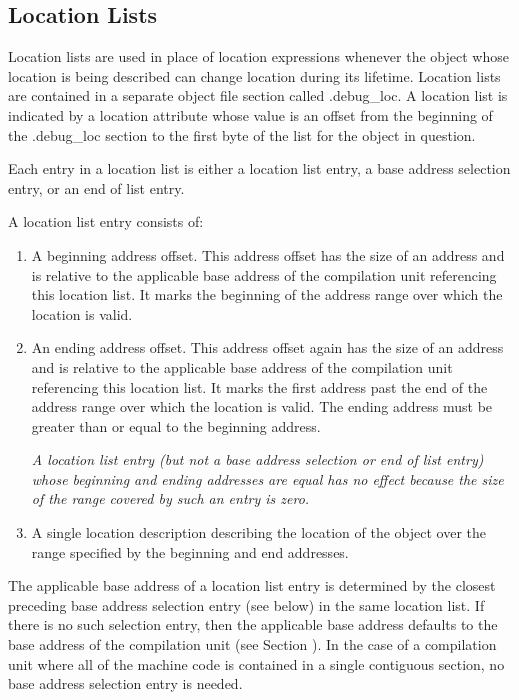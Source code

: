 \subsection{Location Lists}
\label{chap:locationlists}
Location lists are used in place of location expressions
whenever the object whose location is being described
can change location during its lifetime. Location lists
are contained in a separate object file section called
.debug\_loc. A location list is indicated by a location
attribute whose value is an offset from the beginning of
the .debug\_loc section to the first byte of the list for the
object in question.

Each entry in a location list is either a location list entry,
a base address selection entry, or an end of list entry.

A location list entry consists of:

\begin{enumerate}[1]
\item A beginning address offset. 
This address offset has the size of an address and is
relative to the applicable base address of the compilation
unit referencing this location list. It marks the beginning
of the address range over which the location is valid.

\item An ending address offset.  This address offset again
has the size of an address and is relative to the applicable
base address of the compilation unit referencing this location
list. It marks the first address past the end of the address
range over which the location is valid. The ending address
must be greater than or equal to the beginning address.

\textit{A location list entry (but not a base address selection or end of list entry) whose beginning
and ending addresses are equal has no effect because the size of the range covered by such
an entry is zero.}

\item A single location description 
describing the location of the object over the range specified by
the beginning and end addresses.
\end{enumerate}

The applicable base address of a location list entry is
determined by the closest preceding base address selection
entry (see below) in the same location list. If there is
no such selection entry, then the applicable base address
defaults to the base address of the compilation unit (see
Section ).  
In the case of a compilation unit where all of
the machine code is contained in a single contiguous section,
no base address selection entry is needed.

